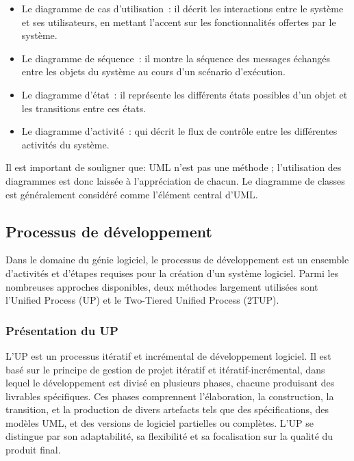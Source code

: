 \begin{itemize}

  \item  Le diagramme de cas d’utilisation : il décrit les interactions entre
    le système et ses utilisateurs, en mettant l’accent sur les fonctionnalités
    offertes par le système.

  \item Le diagramme de séquence : il montre la séquence des messages échangés
    entre les objets du système au cours d’un scénario d’exécution.

  \item Le diagramme d’état : il représente les différents états possibles d’un
    objet et les transitions entre ces états.

  \item Le diagramme d’activité : qui décrit le flux de contrôle entre les
    différentes activités du système.

\end{itemize}

Il est important de souligner que: UML n’est pas une méthode ;
l’utilisation des diagrammes est donc laissée à l’appréciation de chacun.
Le diagramme de classes est généralement considéré comme l’élément central d’UML.

\subsection{Processus de développement}
Dans le domaine du génie logiciel, le processus de développement est un ensemble
d’activités et d’étapes requises pour la création d’un système logiciel.
Parmi les nombreuses approches disponibles, deux méthodes largement utilisées
sont l’Unified Process (\ac{UP}) et le Two-Tiered Unified Process (\ac{2TUP}).

\subsubsection{Présentation du UP}
L’UP est un processus itératif et incrémental de développement logiciel. Il est
basé sur le principe de gestion de projet itératif et itératif-incrémental, dans
lequel le développement est divisé en plusieurs phases, chacune produisant des
livrables spécifiques. Ces phases comprennent l’élaboration, la construction,
la transition, et la production de divers artefacts tels que des spécifications,
des modèles UML, et des versions de logiciel partielles ou complètes. L’UP se
distingue par son adaptabilité, sa flexibilité et sa focalisation sur la qualité du produit final.

